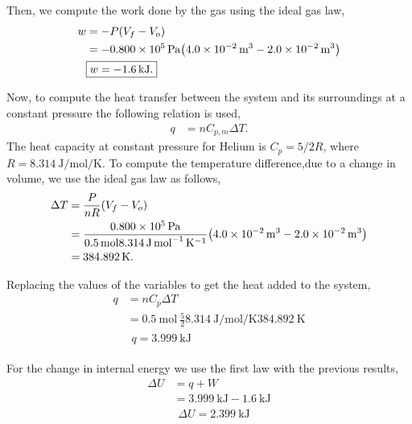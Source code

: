 \documentclass[main.tex]{subfiles}
\begin{document}
Then, we compute the work done by the gas using the ideal gas law,
\begin{align*}
    w &= -P\qty(V_{f}-V_{o}) \\
    &= -\SI{0.800d5}{\pascal}\qty(\SI{4.0d-2}{\meter\tothe{3}}-\SI{2.0d-2}{\meter\tothe{3}}) \\
    &\begin{gathered}
        \boxed{w = -\SI{1.6}{\kilo\joule}.}
    \end{gathered}
\end{align*}

Now, to compute the heat transfer between the system and its surroundings at a constant pressure the following relation is used,
\begin{align*}
    q &= n C_{p,m}\Delta T.
\end{align*}
The heat capacity at constant pressure for Helium is $C_p = 5/2 R$, where $R=\SI{8.314}{\joule\per\mole\per\kelvin}$.
To compute the temperature difference,due to a change in volume, we use the ideal gas law as follows,
\begin{align*}
    \Delta T &= \frac{P}{nR}\qty(V_f - V_o) \\
    &= \frac{\SI{0.800d5}{\pascal}}{\SI{0.5}{\mol}\SI{8.314}{\joule\per\mole\per\kelvin}}\qty(\SI{4.0d-2}{\meter\tothe{3}}-\SI{2.0d-2}{\meter\tothe{3}}) \\
    &= \SI{384.892}{\kelvin}.
\end{align*}

Replacing the values of the variables to get the heat added to the system,
\begin{align*}
    q &= n C_p \Delta T \\
    &= \SI{0.5}{\mol}~\frac{5}{2}\SI[per-mode=fraction]{8.314}{\joule\per\mole\per\kelvin}\SI{384.892}{\kelvin} \\
    &\begin{gathered}
    \boxed{q = \SI{3.999}{\kilo\joule}}
    \end{gathered}
\end{align*}

For the change in internal energy we use the first law with the previous results,%
\begin{align*}
    \Delta U &= q + W \\
    &= \SI{3.999}{\kilo\joule} - \SI{1.6}{\kilo\joule} \\
    &\begin{gathered}
        \boxed{\Delta U = \SI{2.399}{\kilo\joule}}
    \end{gathered}
\end{align*}
\end{document}

